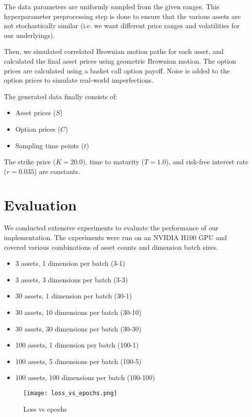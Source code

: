 \documentclass[manuscript,screen,review,acmtog]{acmart}
\begin{document}
The data parameters are uniformly sampled from the given ranges.
This hyperparameter preprocessing step is done to ensure that the various assets are not stochastically similar (i.e. we want different price ranges and volatilities for our underlyings).

Then, we simulated correlated Brownian motion paths for each asset, and calculated the final asset prices using geometric Brownian motion.
The option prices are calculated using a basket call option payoff.
Noise is added to the option prices to simulate real-world imperfections.

The generated data finally consists of:
\begin{itemize}
    \item Asset prices ($S$)
    \item Option prices ($C$)
    \item Sampling time points ($t$)
\end{itemize}

The strike price ($K = 20.0$), time to maturity ($T = 1.0$), and risk-free interest rate ($r = 0.035$) are constants.

\section{Evaluation}
We conducted extensive experiments to evaluate the performance of our implementation. The experiments were run on an NVIDIA H100 GPU and covered various combinations of asset counts and dimension batch sizes.
\begin{itemize}
    \item 3 assets, 1 dimension per batch (3-1)
    \item 3 assets, 3 dimensions per batch (3-3)
    \item 30 assets, 1 dimension per batch (30-1)
    \item 30 assets, 10 dimensions per batch (30-10)
    \item 30 assets, 30 dimensions per batch (30-30)
    \item 100 assets, 1 dimension per batch (100-1)
    \item 100 assets, 5 dimensions per batch (100-5)
    \item 100 assets, 100 dimensions per batch (100-100)
\end{itemize}

\begin{figure}
    \centering
    \texttt{[image: loss\_vs\_epochs.png]}
    \caption{Loss vs epochs}
    \label{fig:loss_epochs}
\end{figure}
\end{document}
